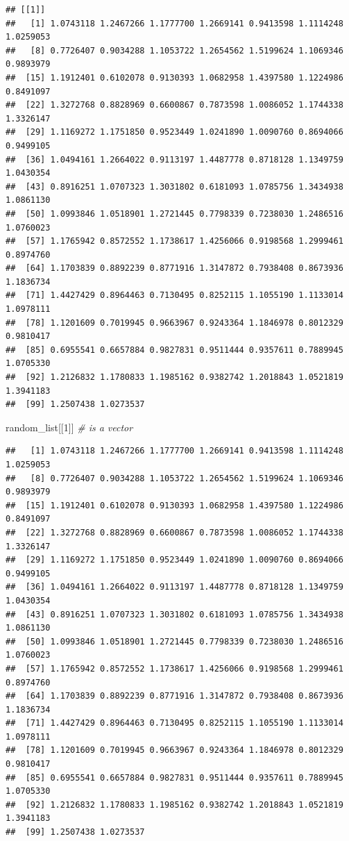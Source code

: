 \documentclass[
]{book}
\newenvironment{Shaded}{\begin{snugshade}}{\end{snugshade}}
\newcommand{\CommentTok}[1]{\textcolor[rgb]{0.56,0.35,0.01}{\textit{#1}}}
\newcommand{\DecValTok}[1]{\textcolor[rgb]{0.00,0.00,0.81}{#1}}
\newcommand{\NormalTok}[1]{#1}
\begin{document}
\begin{verbatim}
## [[1]]
##   [1] 1.0743118 1.2467266 1.1777700 1.2669141 0.9413598 1.1114248 1.0259053
##   [8] 0.7726407 0.9034288 1.1053722 1.2654562 1.5199624 1.1069346 0.9893979
##  [15] 1.1912401 0.6102078 0.9130393 1.0682958 1.4397580 1.1224986 0.8491097
##  [22] 1.3272768 0.8828969 0.6600867 0.7873598 1.0086052 1.1744338 1.3326147
##  [29] 1.1169272 1.1751850 0.9523449 1.0241890 1.0090760 0.8694066 0.9499105
##  [36] 1.0494161 1.2664022 0.9113197 1.4487778 0.8718128 1.1349759 1.0430354
##  [43] 0.8916251 1.0707323 1.3031802 0.6181093 1.0785756 1.3434938 1.0861130
##  [50] 1.0993846 1.0518901 1.2721445 0.7798339 0.7238030 1.2486516 1.0760023
##  [57] 1.1765942 0.8572552 1.1738617 1.4256066 0.9198568 1.2999461 0.8974760
##  [64] 1.1703839 0.8892239 0.8771916 1.3147872 0.7938408 0.8673936 1.1836734
##  [71] 1.4427429 0.8964463 0.7130495 0.8252115 1.1055190 1.1133014 1.0978111
##  [78] 1.1201609 0.7019945 0.9663967 0.9243364 1.1846978 0.8012329 0.9810417
##  [85] 0.6955541 0.6657884 0.9827831 0.9511444 0.9357611 0.7889945 1.0705330
##  [92] 1.2126832 1.1780833 1.1985162 0.9382742 1.2018843 1.0521819 1.3941183
##  [99] 1.2507438 1.0273537
\end{verbatim}

\begin{Shaded}
\begin{Highlighting}[]
\NormalTok{random_list[[}\DecValTok{1}\NormalTok{]] }\CommentTok{# is a vector}
\end{Highlighting}
\end{Shaded}

\begin{verbatim}
##   [1] 1.0743118 1.2467266 1.1777700 1.2669141 0.9413598 1.1114248 1.0259053
##   [8] 0.7726407 0.9034288 1.1053722 1.2654562 1.5199624 1.1069346 0.9893979
##  [15] 1.1912401 0.6102078 0.9130393 1.0682958 1.4397580 1.1224986 0.8491097
##  [22] 1.3272768 0.8828969 0.6600867 0.7873598 1.0086052 1.1744338 1.3326147
##  [29] 1.1169272 1.1751850 0.9523449 1.0241890 1.0090760 0.8694066 0.9499105
##  [36] 1.0494161 1.2664022 0.9113197 1.4487778 0.8718128 1.1349759 1.0430354
##  [43] 0.8916251 1.0707323 1.3031802 0.6181093 1.0785756 1.3434938 1.0861130
##  [50] 1.0993846 1.0518901 1.2721445 0.7798339 0.7238030 1.2486516 1.0760023
##  [57] 1.1765942 0.8572552 1.1738617 1.4256066 0.9198568 1.2999461 0.8974760
##  [64] 1.1703839 0.8892239 0.8771916 1.3147872 0.7938408 0.8673936 1.1836734
##  [71] 1.4427429 0.8964463 0.7130495 0.8252115 1.1055190 1.1133014 1.0978111
##  [78] 1.1201609 0.7019945 0.9663967 0.9243364 1.1846978 0.8012329 0.9810417
##  [85] 0.6955541 0.6657884 0.9827831 0.9511444 0.9357611 0.7889945 1.0705330
##  [92] 1.2126832 1.1780833 1.1985162 0.9382742 1.2018843 1.0521819 1.3941183
##  [99] 1.2507438 1.0273537
\end{verbatim}
\end{document}
